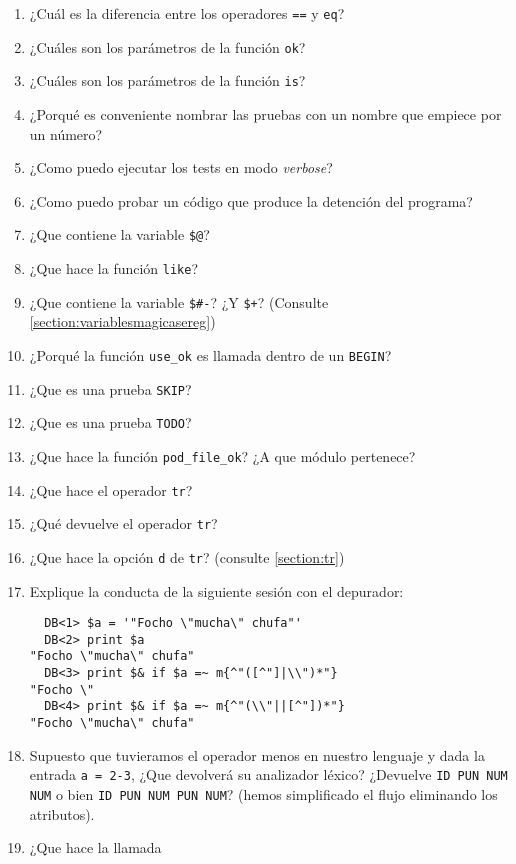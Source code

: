 \begin{enumerate}
\item
¿Cuál es la diferencia entre los operadores \verb|==| y \verb|eq|?
\item
¿Cuáles son los parámetros de la función \verb|ok|?
\item
¿Cuáles son los parámetros de la función \verb|is|?
\item
¿Porqué es conveniente nombrar las pruebas con un nombre que empiece por
un número?
\item
¿Como puedo ejecutar los tests en modo \emph{verbose}?
\item
¿Como puedo probar un código que produce la detención del programa?
\item
¿Que contiene la variable \verb|$@|?
\item
¿Que hace la función \verb|like|?
\item
¿Que contiene la variable \verb|$#-|? ¿Y \verb|$+|?
(Consulte \ref{section:variablesmagicasereg})
\item
¿Porqué la función \verb|use_ok| es llamada dentro de un \verb|BEGIN|?
\item
¿Que es una prueba \verb|SKIP|?
\item
¿Que es una prueba \verb|TODO|?
\item
¿Que hace la función \verb|pod_file_ok|?
¿A que módulo pertenece?
\item
¿Que hace el operador \verb|tr|?
\item
¿Qué devuelve el operador \verb|tr|?
\item
¿Que hace la opción \verb|d| de \verb|tr|?
(consulte \ref{section:tr})
\item
Explique la conducta de la siguiente sesión con el depurador:
\begin{verbatim}
  DB<1> $a = '"Focho \"mucha\" chufa"'
  DB<2> print $a
"Focho \"mucha\" chufa"
  DB<3> print $& if $a =~ m{^"([^"]|\\")*"}
"Focho \"
  DB<4> print $& if $a =~ m{^"(\\"||[^"])*"}
"Focho \"mucha\" chufa"
\end{verbatim}
\item
Supuesto que tuvieramos el operador menos en nuestro lenguaje y
dada la entrada \verb|a = 2-3|, ¿Que devolverá su analizador léxico? 
¿Devuelve \verb|ID PUN NUM NUM| o bien \verb|ID PUN NUM PUN NUM|?
(hemos simplificado el flujo eliminando los atributos).
\item
¿Que hace la llamada

\end{enumerate}
